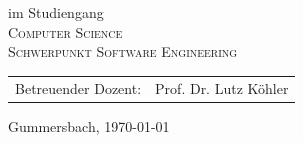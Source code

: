 \begin{titlepage}
\begin{center}
\vspace{0.4cm}

\begin{large}
im Studiengang\\ 
\vspace{0.2cm}
\textsc{Computer Science\\
		Schwerpunkt Software Engineering}
\end{large}


\vspace{1.0cm}

\begin{tabular}{rl}
        Betreuender Dozent:  &  Prof. Dr. Lutz Köhler\\[1.0em]
\end{tabular}

\vspace{2.6cm}

\begin{large}
Gummersbach, {\today}
\end{large}

\end{center}


\newpage
\thispagestyle{empty}

\end{titlepage}
